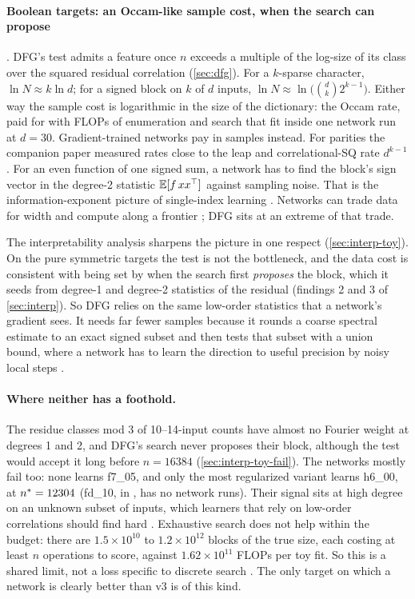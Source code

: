 \paragraph{Boolean targets: an Occam-like sample cost, when the search can propose} . DFG's test admits a feature once $n$ exceeds a multiple of the log-size of its class over the squared residual correlation (\cref{sec:dfg}). For a $k$-sparse character, $\ln N\approx k\ln d$; for a signed block on $k$ of $d$ inputs, $\ln N\approx\ln\bigl(\binom dk2^{k-1}\bigr)$. Either way the sample cost is logarithmic in the size of the dictionary: the Occam rate, paid for with FLOPs of enumeration and search that fit inside one network run at $d=30$. Gradient-trained networks pay in samples instead. For parities the companion paper measured rates close to the leap and correlational-SQ rate $d^{k-1}$ \cite{gdcircuit2026,abbe2022msp,abbe2023leap,barak2022hidden,kearns1998sq}. For an even function of one signed sum, a network has to find the block's sign vector in the degree-2 statistic $\mathbb{E}[f\,xx^\top]$ against sampling noise. That is the information-exponent picture of single-index learning \cite{benarous2021online,damian2024gaps}. Networks can trade data for width and compute along a frontier \cite{edelman2023pareto}; DFG sits at an extreme of that trade.

The interpretability analysis sharpens the picture in one respect (\cref{sec:interp-toy}). On the pure symmetric targets the test is not the bottleneck, and the data cost is consistent with being set by when the search first \emph{proposes} the block, which it seeds from degree-1 and degree-2 statistics of the residual (findings 2 and 3 of \cref{sec:interp}). So DFG relies on the same low-order statistics that a network's gradient sees. It needs far fewer samples because it rounds a coarse spectral estimate to an exact signed subset and then tests that subset with a union bound, where a network has to learn the direction to useful precision by noisy local steps .

\paragraph{Where neither has a foothold.} The residue classes mod 3 of 10--14-input counts have almost no Fourier weight at degrees 1 and 2, and DFG's search never proposes their block, although the test would accept it long before $n=16384$ (\cref{sec:interp-toy-fail}). The networks mostly fail too: none learns f7\_05, and only the most regularized variant learns h6\_00, at $n^{*}=12304$ (fd\_10, in , has no network runs). Their signal sits at high degree on an unknown subset of inputs, which learners that rely on low-order correlations should find hard \cite{kearns1998sq}. Exhaustive search does not help within the budget: there are $1.5\times10^{10}$ to $1.2\times10^{12}$ blocks of the true size, each costing at least $n$ operations to score, against $1.62\times10^{11}$ FLOPs per toy fit. So this is a shared limit, not a loss specific to discrete search . The only target on which a network is clearly better than v3 is of this kind.

